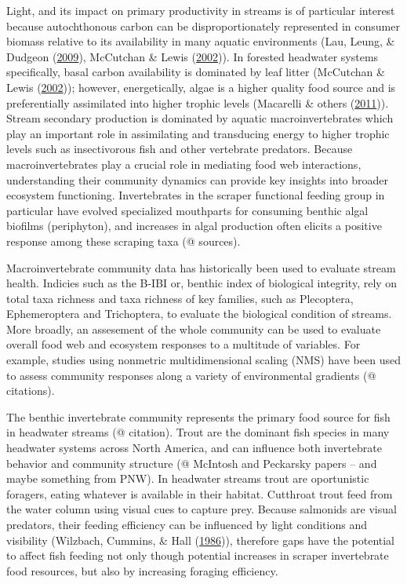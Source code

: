 \documentclass[double,12pt]{beavtex}
\begin{document}
  Light, and its impact on primary productivity in streams is of
  particular interest because autochthonous carbon can be
  disproportionately represented in consumer biomass relative to its
  availability in many aquatic environments (Lau, Leung, \& Dudgeon
  (\protect\hyperlink{ref-Lau2009}{2009}), McCutchan \& Lewis
  (\protect\hyperlink{ref-McCutchan2002}{2002})). In forested headwater
  systems specifically, basal carbon availability is dominated by leaf
  litter (McCutchan \& Lewis
  (\protect\hyperlink{ref-McCutchan2002}{2002})); however, energetically,
  algae is a higher quality food source and is preferentially assimilated
  into higher trophic levels (Macarelli \& others
  (\protect\hyperlink{ref-Macarelli2011}{2011})). Stream secondary
  production is dominated by aquatic macroinvertebrates which play an
  important role in assimilating and transducing energy to higher trophic
  levels such as insectivorous fish and other vertebrate predators.
  Because macroinvertebrates play a crucial role in mediating food web
  interactions, understanding their community dynamics can provide key
  insights into broader ecosystem functioning. Invertebrates in the
  scraper functional feeding group in particular have evolved specialized
  mouthparts for consuming benthic algal biofilms (periphyton), and
  increases in algal production often elicits a positive response among
  these scraping taxa (@ sources).
  
  Macroinvertebrate community data has historically been used to evaluate
  stream health. Indicies such as the B-IBI or, benthic index of
  biological integrity, rely on total taxa richness and taxa richness of
  key families, such as Plecoptera, Ephemeroptera and Trichoptera, to
  evaluate the biological condition of streams. More broadly, an
  assesement of the whole community can be used to evaluate overall food
  web and ecosystem responses to a multitude of variables. For example,
  studies using nonmetric multidimensional scaling (NMS) have been used to
  assess community responses along a variety of environmental gradients (@
  citations).
  
  The benthic invertebrate community represents the primary food source
  for fish in headwater streams (@ citation). Trout are the dominant fish
  species in many headwater systems across North America, and can
  influence both invertebrate behavior and community structure (@ McIntosh
  and Peckarsky papers -- and maybe something from PNW). In headwater
  streams trout are oportunistic foragers, eating whatever is available in
  their habitat. Cutthroat trout feed from the water column using visual
  cues to capture prey. Because salmonids are visual predators, their
  feeding efficiency can be influenced by light conditions and visibility
  (Wilzbach, Cummins, \& Hall
  (\protect\hyperlink{ref-Wilzbach1986}{1986})), therefore gaps have the
  potential to affect fish feeding not only though potential increases in
  scraper invertebrate food resources, but also by increasing foraging
  efficiency.
  
\end{document}
